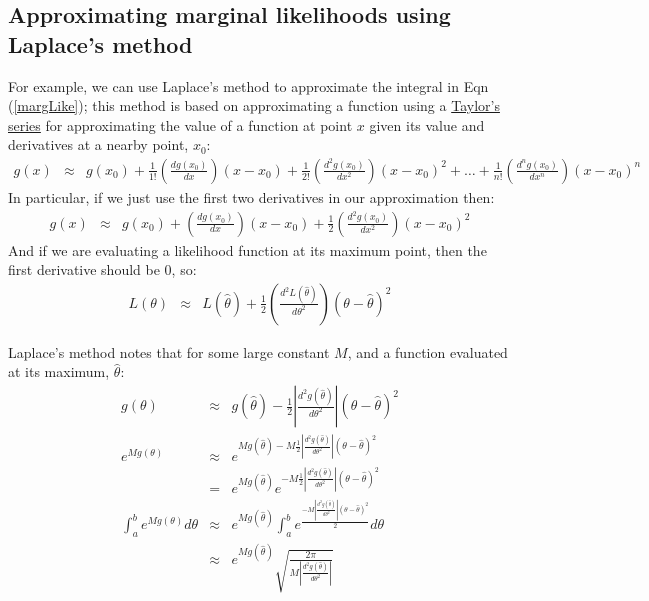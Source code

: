 \documentclass[11pt]{article}
\begin{document}
\subsection{Approximating marginal likelihoods using Laplace's method}
For example, we can use Laplace's method to approximate the integral in Eqn (\ref{margLike}); this method is based on approximating a function using a 
\href{http://en.wikipedia.org/wiki/Taylor%27s_theorem}{Taylor's  series}
 for approximating the value of a function at point $x$ given its value and derivatives at a nearby point, $x_0$:
\begin{eqnarray*}\nonumber
	g(x) & \approx &g(x_0) + \frac{1}{1!}\left(\frac{d g(x_0)}{d x}\right)(x-x_0) + \frac{1}{2!}\left(\frac{d^2 g(x_0)}{d x^2}\right)(x-x_0)^2 + \ldots + \frac{1}{n!}\left(\frac{d^n g(x_0)}{d x^n}\right)(x-x_0)^n 
\end{eqnarray*}
In particular, if we just use the first two derivatives in our approximation then:
\begin{eqnarray*}\nonumber
	g(x) & \approx &g(x_0) + \left(\frac{d g(x_0)}{d x}\right)(x-x_0) + \frac{1}{2}\left(\frac{d^2 g(x_0)}{d x^2}\right)(x-x_0)^2
\end{eqnarray*}
And if we are evaluating a likelihood function at its maximum point, then the first derivative should be 0, so:
\begin{eqnarray*}\nonumber
	L(\theta) & \approx &L(\hat\theta) +  \frac{1}{2}\left(\frac{d^2 L(\hat\theta)}{d \theta^2}\right)(\theta-\hat\theta)^2
\end{eqnarray*}

Laplace's method notes that for some large constant $M$, and a function evaluated at its maximum, $\hat\theta$:
\begin{eqnarray*}\nonumber
	g(\theta) & \approx & g(\hat\theta) -  \frac{1}{2}\left|\frac{d^2 g(\hat\theta)}{d \theta^2}\right|(\theta-\hat\theta)^2 \\
	e^{Mg(\theta)} & \approx & e^{Mg(\hat\theta) -  M\frac{1}{2}\left|\frac{d^2 g(\hat\theta)}{d \theta^2}\right|(\theta-\hat\theta)^2} \\
	               & = & e^{Mg(\hat\theta)}  e^{-M\frac{1}{2}\left|\frac{d^2 g(\hat\theta)}{d \theta^2}\right|(\theta-\hat\theta)^2} \\
	\int_a^b e^{Mg(\theta)} d\theta & \approx &  e^{Mg(\hat\theta)}   \int_a^b e^{\frac{-M\left|\frac{d^2 g(\hat\theta)}{d \theta^2}\right|(\theta-\hat\theta)^2}{2}}d\theta \\
	& \approx &  e^{Mg(\hat\theta)}   \sqrt{\frac{2\pi}{M\left|\frac{d^2 g(\hat\theta)}{d \theta^2}\right|}}
\end{eqnarray*}
\end{document}
